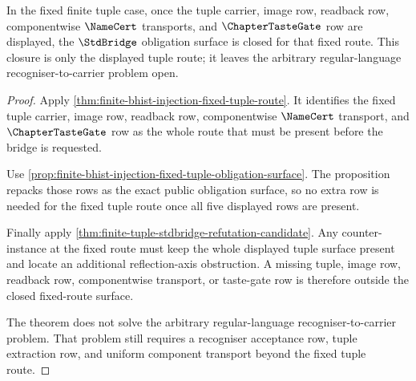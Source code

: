\begin{theorem}
\label{thm:finite-tuple-stdbridge-fixed-route-closure}
In the fixed finite tuple case, once the tuple carrier, image row, readback row, componentwise $\NameCert$ transports, and $\ChapterTasteGate$ row are displayed, the $\StdBridge$ obligation surface is closed for that fixed route. This closure is only the displayed tuple route; it leaves the arbitrary regular-language recogniser-to-carrier problem open.
\end{theorem}
\begin{proof}
Apply \autoref{thm:finite-bhist-injection-fixed-tuple-route}. It identifies the fixed tuple carrier, image row, readback row, componentwise $\NameCert$ transport, and $\ChapterTasteGate$ row as the whole route that must be present before the bridge is requested.

Use \autoref{prop:finite-bhist-injection-fixed-tuple-obligation-surface}. The proposition repacks those rows as the exact public obligation surface, so no extra row is needed for the fixed tuple route once all five displayed rows are present.

Finally apply \autoref{thm:finite-tuple-stdbridge-refutation-candidate}. Any counter-instance at the fixed route must keep the whole displayed tuple surface present and locate an additional reflection-axis obstruction. A missing tuple, image row, readback row, componentwise transport, or taste-gate row is therefore outside the closed fixed-route surface.

The theorem does not solve the arbitrary regular-language recogniser-to-carrier problem. That problem still requires a recogniser acceptance row, tuple extraction row, and uniform component transport beyond the fixed tuple route.
\end{proof}

